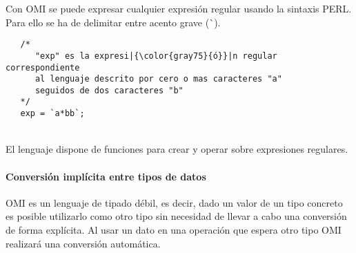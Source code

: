 Con OMI se puede expresar cualquier expresión regular usando la sintaxis PERL. Para ello se ha de delimitar entre acento grave (\`\ ). \\

\begin{lstlisting}
   /*
      "exp" es la expresi|{\color{gray75}{ó}}|n regular correspondiente
      al lenguaje descrito por cero o mas caracteres "a" 
      seguidos de dos caracteres "b"
   */
   exp = `a*bb`; 
\end{lstlisting} 
\hfill\\

El lenguaje dispone de funciones para crear y operar sobre expresiones regulares.


\paragraph{Conversión implícita entre tipos de datos}\label{sec:type_iconv}
OMI es un lenguaje de tipado débil, es decir, dado un valor de un tipo concreto es posible utilizarlo como otro tipo sin necesidad de 
llevar a cabo una conversión de forma explícita. Al usar un dato en una operación que espera  otro tipo OMI realizará
una conversión automática.



